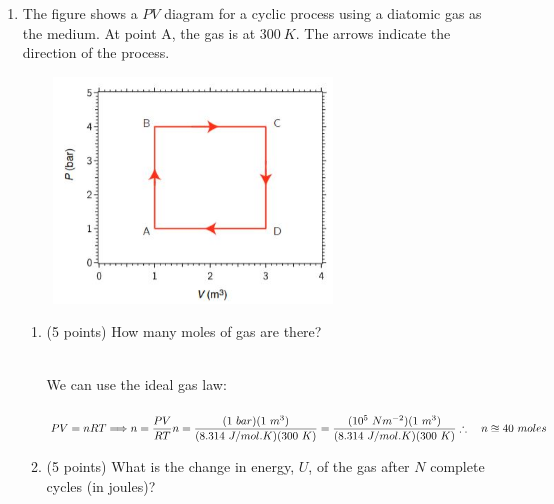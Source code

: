 \documentclass[fleqn]{article}
\begin{document}
\begin{enumerate}
    \pagebreak

    \item The figure shows a $PV$ diagram for a cyclic process using a diatomic gas as the medium. At
    point A, the gas is at $300 ~ K$. The arrows indicate the direction of the process.
    \begin{center}
      \includegraphics[height=6cm, width=9cm]{question6.JPG}
    \end{center}
    \begin{enumerate}
      \item (5 points) How many moles of gas are there?

        \textcolor{hwColor}{
          \\
          We can use the ideal gas law:
          \\
          \\
          $
            PV=nRT \Longrightarrow n=\dfrac{PV}{RT}
            \\
            \\
            \\
            n=\dfrac{(1 ~ bar) (1 ~ m^3)}{(8.314 ~ J/mol.K)(300 ~ K)}
            =\dfrac{(10^5 ~ Nm^{-2}) (1 ~ m^3)}{(8.314 ~ J/mol.K)(300 ~ K)}
            \\
            \\
            \\
            \therefore ~~~ n \approxeq 40 ~ moles
          $
          \\
        }

      \item (5 points) What is the change in energy, $U$, of the gas after $N$ complete cycles (in joules)?
  

\end{enumerate}
\end{enumerate}
\end{document}
